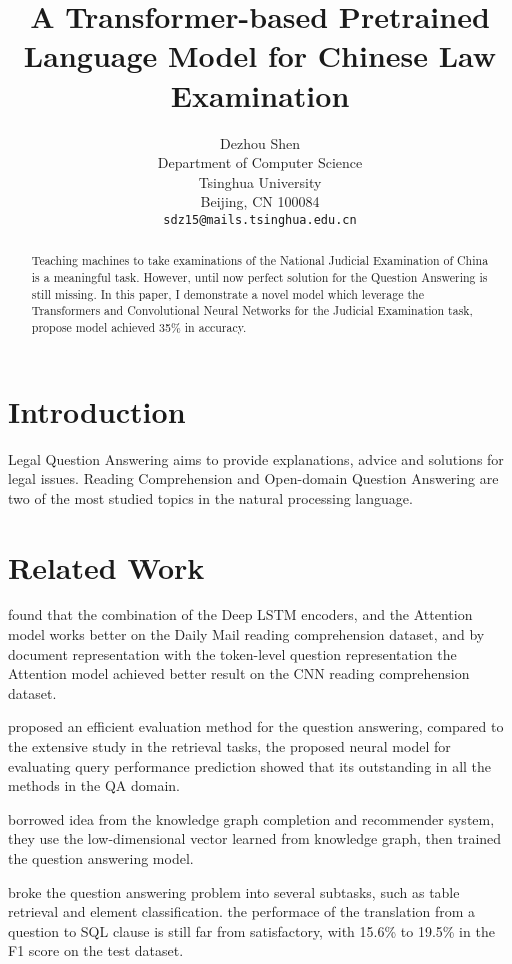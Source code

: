 \documentclass[11pt,a4paper]{article}
\title{A Transformer-based Pretrained Language Model for Chinese Law Examination}
\author{Dezhou Shen \\
  Department of Computer Science\\
  Tsinghua University\\
  Beijing, CN 100084\\
  \texttt{sdz15@mails.tsinghua.edu.cn} \\}
\date{}
\begin{document}
\maketitle
\begin{abstract}
 Teaching machines to take examinations of the National Judicial Examination of China is a meaningful task.
 However, until now perfect solution for the Question Answering is still missing.
 In this paper, I demonstrate a novel model which leverage the Transformers and Convolutional Neural Networks for the Judicial Examination task,
    propose model achieved 35\% in accuracy.
\end{abstract}

\section{Introduction}

  Legal Question Answering aims to provide explanations, advice and solutions for legal issues.
Reading Comprehension and Open-domain Question Answering are two of the most studied topics in the natural processing language.



\section{Related Work}

\citet{hermann2015teaching} found that the combination of the Deep LSTM encoders, and the Attention model works better on the Daily Mail reading comprehension dataset,
 and by document representation with the token-level question representation the Attention model achieved better result on the CNN reading comprehension dataset.

\citet{hashemi2019performance} proposed an efficient evaluation method for the question answering, compared to the extensive study in
the retrieval tasks, the proposed neural model for evaluating query performance prediction showed that its outstanding in all the methods in the QA domain.

\citet{huang2019knowledge} borrowed idea from the knowledge graph completion and recommender system, they use the low-dimensional vector learned from knowledge graph,
then trained the question answering model.

\citet{karki2019question} broke the question answering problem into several subtasks, such as table retrieval and element classification.
the performace of the translation from a question to SQL clause is still far from satisfactory, with 15.6\% to 19.5\% in the F1 score on the test dataset.
\end{document}
